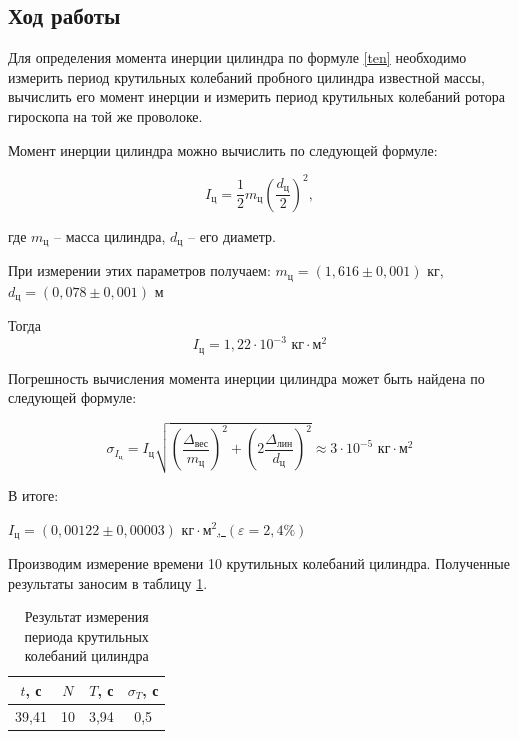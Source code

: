 \documentclass[a4paper, 12pt]{article}
\begin{document}
\begin{center}
    \section*{Ход работы}

    Для определения момента инерции цилиндра по формуле \eqref{ten} необходимо измерить период крутильных колебаний пробного цилиндра известной массы, вычислить его момент инерции и измерить период крутильных колебаний ротора гироскопа на той же проволоке.
    \bigskip

    Момент инерции цилиндра можно вычислить по следующей формуле:

    \begin{equation}
        I_\text{ц} = \frac{1}{2}m_\text{ц}\left( \frac{d_\text{ц}}{2}\right)^2,
    \end{equation}
    
    где $ m_\text{ц} $ -- масса цилиндра, $ d_\text{ц} $ -- его диаметр.
    \bigskip

    При измерении этих параметров получаем:
	 $ m_\text{ц} = \left( 1,616 \pm 0,001\right) $ кг,
      $ d_\text{ц} = \left( 0,078 \pm 0,001 \right) $ м

    \bigskip
    Тогда
    \begin{equation}
        I_\text{ц} = 1,22 \cdot 10^{-3} \text{ кг} \cdot \text{м}^2
    \end{equation}

    Погрешность вычисления момента инерции цилиндра может быть найдена по следующей формуле:

    \begin{equation}
        \sigma_{I_\text{ц}} = I_\text{ц}\sqrt{\left( \frac{\Delta_\text{вес}}{m_\text{ц}} \right)^2 + \left(2 \frac{\Delta_\text{лин}}{d_\text{ц}} \right)^2 } \approx 3 \cdot 10^{-5} \text{ кг} \cdot \text{м}^2
    \end{equation}

    В итоге:
    \bigskip
    
    \underline{$ I_\text{ц} = \left(0,00122 \pm 0,00003 \right) \text{ кг} \cdot \text{м}^2 $, $ \left( \varepsilon = 2,4 \% \right) $}

    \bigskip \bigskip

    Производим измерение времени 10 крутильных колебаний цилиндра. Полученные результаты заносим в таблицу \ref{krut_cil}.
    \bigskip

    \begin{table}[H]
    	\centering
    	\begin{tabular}{|c|c|c|c|}
    		                                                       \hline
    		$ t $, с & $ N $ & $ T $, с & $ \sigma_T $, с      \\ \hline
                39,41    &   10  &  3,94    & 0,5                  \\ \hline
    	\end{tabular}
    	\caption{Результат измерения периода крутильных колебаний цилиндра}
    	\label{krut_cil}
    \end{table}


\end{center}
\end{document}
